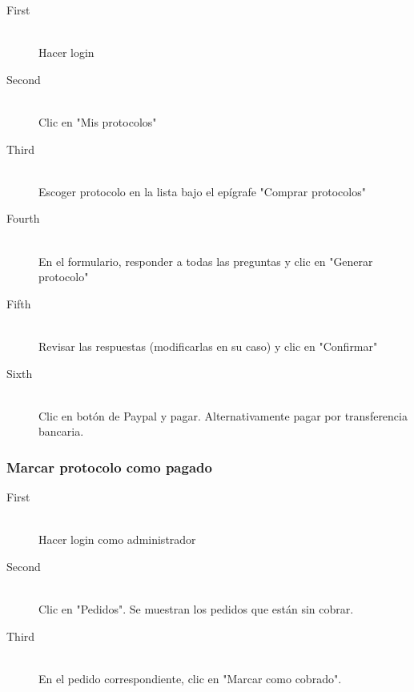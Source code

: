 \documentclass[12pt, spanish]{article}
\begin{document}
    \begin{description}

        \item[First] \hfill \\
        Hacer login

        \item[Second] \hfill \\
        Clic en "Mis protocolos"

        \item[Third] \hfill \\
        Escoger protocolo en la lista bajo el epígrafe "Comprar protocolos"

        \item[Fourth] \hfill \\
        En el formulario, responder a todas las preguntas y clic en "Generar protocolo"

        \item[Fifth] \hfill \\
            Revisar las respuestas (modificarlas en su caso) y clic en "Confirmar"

        \item[Sixth] \hfill \\
        Clic en botón de Paypal y pagar.  Alternativamente pagar por transferencia bancaria.

    \end{description} 


    \subsubsection{Marcar protocolo como pagado}

    \begin{description}

        \item[First] \hfill \\
        Hacer login como administrador

        \item[Second] \hfill \\
        Clic en "Pedidos". Se muestran los pedidos que están sin cobrar.

        \item[Third] \hfill \\
        En el pedido correspondiente, clic en "Marcar como cobrado".

    \end{description} 
\end{document}
